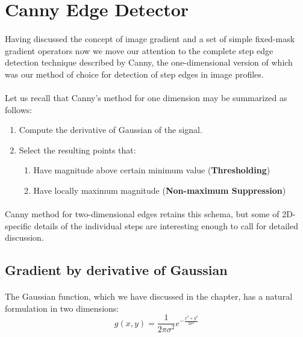 \section{Canny Edge Detector}

\paragraph*{}
Having discussed the concept of image gradient and a set of simple fixed-mask gradient operators now we move our attention to the complete step edge detection technique described\cite{Canny86} by Canny, the one-dimensional version of which was our method of choice for detection of step edges in image profiles. 

\paragraph*{}
Let us recall that Canny's method for one dimension may be summarized as follows:
\begin{enumerate}
	\item Compute the derivative of Gaussian of the signal.
	\item Select the resulting points that:
	\begin{enumerate}
		\item Have magnitude above certain minimum value (\textbf{Thresholding})
		\item Have locally maximum magnitude (\textbf{Non-maximum Suppression})
	\end{enumerate}
\end{enumerate}

\paragraph*{}
Canny method for two-dimensional edges retains this schema, but some of 2D-specific details of the individual steps are interesting enough to call for detailed discussion.

\subsection{Gradient by derivative of Gaussian}

\paragraph*{}
The Gaussian function, which we have discussed in the  chapter, has a natural formulation in two dimensions:
\[
    g(x,y)= \frac{1}{2\pi \sigma^2} e^{-\frac{x^2+y^2}{2 \sigma^2}}
\]

